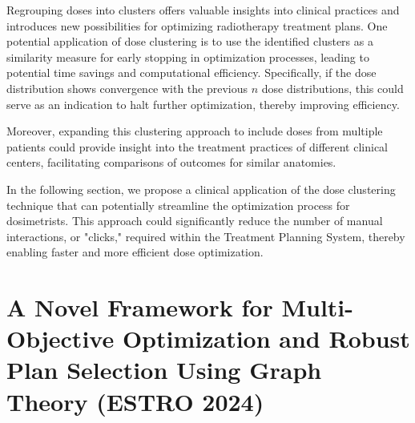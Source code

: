 Regrouping doses into clusters offers valuable insights into clinical practices and introduces new possibilities for optimizing radiotherapy treatment plans.
One potential application of dose clustering is to use the identified clusters as a similarity measure for early stopping in optimization processes, leading to potential time savings and computational efficiency.
Specifically, if the dose distribution shows convergence with the previous $n$ dose distributions, this could serve as an indication to halt further optimization, thereby improving efficiency.

Moreover, expanding this clustering approach to include doses from multiple patients could provide insight into the treatment practices of different clinical centers, facilitating comparisons of outcomes for similar anatomies.

In the following section, we propose a clinical application of the dose clustering technique that can potentially streamline the optimization process for dosimetrists.
This approach could significantly reduce the number of manual interactions, or "clicks," required within the Treatment Planning System, thereby enabling faster and more efficient dose optimization.



\section[Novel Dosimetry Automation Approach with Graph Theory]{A Novel Framework for Multi-Objective Optimization and Robust Plan Selection Using Graph Theory (ESTRO 2024)}

